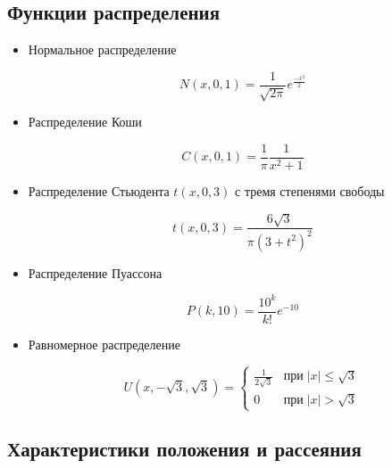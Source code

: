 \documentclass[12pt,a4paper]{article}
\begin{document}
	\subsection{Функции распределения}
	\begin{itemize}
		\item Нормальное распределение

		\begin{equation} \label{eq:normal}
			N(x, 0, 1) = \frac{1}{\sqrt{2\pi}}e^\frac{-x^2}{2}
		\end{equation}

		\item Распределение Коши

		\begin{equation} \label{eq:cauchy}
			C(x, 0, 1) = \frac{1}{\pi}\frac{1}{x^2+1}
		\end{equation}

		\item Распределение Стьюдента \( t(x, 0, 3) \) с тремя степенями свободы

		\begin{equation} \label{eq:student}
			t(x, 0, 3) = \frac{6\sqrt3}{\pi(3 + t^2)^2}
		\end{equation}

		\item Распределение Пуассона

		\begin{equation} \label{eq:poisson}
			P(k, 10) = \frac{10^k}{k!}e^{-10}
		\end{equation}

		\item Равномерное распределение

		\begin{equation} \label{eq:uniform}
			U(x, -\sqrt3, \sqrt3) = \begin{cases}
				\frac{1}{2\sqrt3} & \mbox{при} \; |x| \leq \sqrt3\\
				0 & \mbox{при} \; |x| > \sqrt3
			\end{cases}
		\end{equation}
	\end{itemize}

	\subsection{Характеристики положения и рассеяния}
\end{document}
